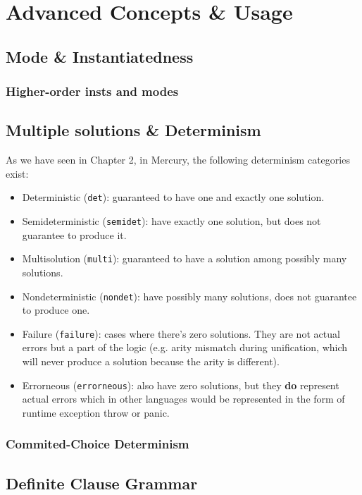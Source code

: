 \chapter{Advanced Concepts \& Usage}

\section{Mode \& Instantiatedness}

\subsection{Higher-order insts and modes}

\section{Multiple solutions \& Determinism}

As we have seen in Chapter 2, in Mercury, the following determinism categories exist:

\begin{itemize}
	\item Deterministic (\texttt{det}): guaranteed to have one and exactly one solution.
	\item Semideterministic (\texttt{semidet}): have exactly one solution, but does not guarantee to produce it.
	\item Multisolution (\texttt{multi}): guaranteed to have a solution among possibly many solutions.
	\item Nondeterministic (\texttt{nondet}): have possibly many solutions, does not guarantee to produce one.
	\item Failure (\texttt{failure}): cases where there's zero solutions. They are not actual errors but a part of the logic (e.g. arity mismatch during unification, which will never produce a solution because the arity is different).
	\item Errorneous (\texttt{errorneous}): also have zero solutions, but they \textbf{do} represent actual errors which in other languages would be represented in the form of runtime exception throw or panic.
\end{itemize}


\subsection{Commited-Choice Determinism}

\section{Definite Clause Grammar}

